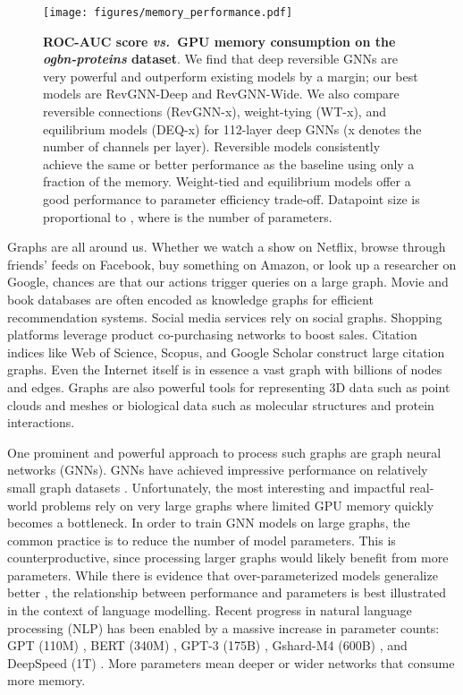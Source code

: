 \documentclass{article}
\newcommand{\vs}{\emph{vs.~}}
\begin{document}
\begin{figure}[h]
    \centering
    \texttt{[image: figures/memory\_performance.pdf]}
    \caption{\textbf{ROC-AUC score \vs GPU memory consumption on the \emph{ogbn-proteins} dataset}. We find that deep reversible GNNs are very powerful and outperform existing models by a margin; our best models are RevGNN-Deep and RevGNN-Wide. We also compare reversible connections (RevGNN-x), weight-tying (WT-x), and equilibrium models (DEQ-x) for 112-layer deep GNNs (x denotes the number of channels per layer). Reversible models consistently achieve the same or better performance as the baseline using only a fraction of the memory. Weight-tied and equilibrium models offer a good performance to parameter efficiency trade-off. Datapoint size is proportional to , where  is the number of parameters. 
    }
    \label{fig:memory_performance_obgn_proteins}
    \vspace{-16pt}
\end{figure}

Graphs are all around us. 
Whether we watch a show on Netflix, browse through friends' feeds on Facebook, buy something on Amazon, or look up a researcher on Google, chances are that our actions trigger queries on a large graph. Movie and book databases are often encoded as knowledge graphs for efficient recommendation systems. Social media services rely on social graphs. Shopping platforms leverage product co-purchasing networks to boost sales. Citation indices like Web of Science, Scopus, and Google Scholar construct large citation graphs. Even the Internet itself is in essence a vast graph with billions of nodes and edges. 
Graphs are also powerful tools for representing 3D data such as point clouds and meshes or biological data such as molecular structures and protein interactions.

One prominent and powerful approach to process such graphs are graph neural networks (GNNs). GNNs have achieved impressive performance on relatively small graph datasets \citep{yang2016revisiting,zitnik2017predicting,shchur2018pitfalls}.
Unfortunately, the most interesting and impactful real-world problems rely on very large graphs where limited GPU memory quickly becomes a bottleneck. In order to train GNN models on large graphs, the common practice is to reduce the number of model parameters. This is counterproductive, since processing larger graphs would likely benefit from more parameters.  
While there is evidence that over-parameterized models generalize better \citep{neyshabur2018towards,Belkin2019}, the relationship between performance and parameters is best illustrated in the context of language modelling. Recent progress in natural language processing (NLP) has been enabled by a massive increase in parameter counts: GPT (110M) \citep{radford2018improving}, BERT (340M) \citep{devlin2018bert}, GPT-3 (175B) \citep{brown2020language}, Gshard-M4 (600B) \citep{lepikhin2020gshard}, and DeepSpeed (1T) \citep{rasley2020deepspeed}. More parameters mean deeper or wider networks that consume more memory.
\end{document}
